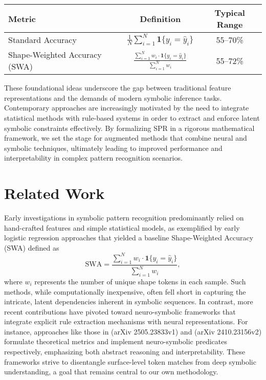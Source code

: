 \documentclass{article}
\begin{document}
\begin{center}
\begin{tabular}{lcc}
\hline
Metric & Definition & Typical Range \\
\hline
Standard Accuracy & \(\frac{1}{N}\sum_{i=1}^{N}\mathbf{1}\{y_i = \hat{y}_i\}\) & 55--70\% \\
Shape-Weighted Accuracy (SWA) & \(\frac{\sum_{i=1}^{N} w_i \cdot \mathbf{1}\{y_i = \hat{y}_i\}}{\sum_{i=1}^{N} w_i}\) & 55--72\% \\
\hline
\end{tabular}
\end{center}

These foundational ideas underscore the gap between traditional feature representations and the demands of modern symbolic inference tasks. Contemporary approaches are increasingly motivated by the need to integrate statistical methods with rule-based systems in order to extract and enforce latent symbolic constraints effectively. By formalizing SPR in a rigorous mathematical framework, we set the stage for augmented methods that combine neural and symbolic techniques, ultimately leading to improved performance and interpretability in complex pattern recognition scenarios.

\section{Related Work}
Early investigations in symbolic pattern recognition predominantly relied on hand-crafted features and simple statistical models, as exemplified by early logistic regression approaches that yielded a baseline Shape-Weighted Accuracy (SWA) defined as 
\[
\text{SWA} = \frac{\sum_{i=1}^{N} w_i \cdot \mathbf{1}\{y_i=\hat{y}_i\}}{\sum_{i=1}^{N} w_i},
\]
where \(w_i\) represents the number of unique shape tokens in each sample. Such methods, while computationally inexpensive, often fell short in capturing the intricate, latent dependencies inherent in symbolic sequences. In contrast, more recent contributions have pivoted toward neuro-symbolic frameworks that integrate explicit rule extraction mechanisms with neural representations. For instance, approaches like those in (arXiv 2505.23833v1) and (arXiv 2410.23156v2) formulate theoretical metrics and implement neuro-symbolic predicates respectively, emphasizing both abstract reasoning and interpretability. These frameworks strive to disentangle surface-level token matches from deep symbolic understanding, a goal that remains central to our own methodology.
\end{document}
